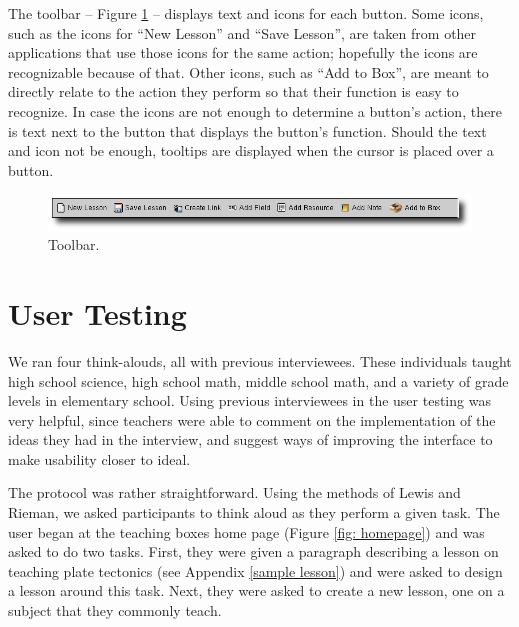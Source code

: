 \documentclass[10pt,letter,titlepage]{article}
\begin{document}
The toolbar -- Figure \ref{fig: toolbar ss} -- displays text and icons for each
button. Some icons, such as the icons for ``New Lesson'' and ``Save Lesson'',
are taken from other applications that use those icons for the same action;
hopefully the icons are recognizable because of that. Other icons, such as ``Add
to Box'', are meant to directly relate to the action they perform so that their
function is easy to recognize. In case the icons are not enough to determine a
button's action, there is text next to the button that displays the button's
function. Should the text and icon not be enough, tooltips are displayed when
the cursor is placed over a button.

\begin{figure}[htb]
	\centering
	\includegraphics[width=0.9\linewidth]{figures/toolbar}
	\caption{Toolbar.}
	\label{fig: toolbar ss}
\end{figure}

\section{User Testing}
We ran four think-alouds, all with previous interviewees.  These individuals
taught high school science, high school math, middle school math, and a variety
of grade levels in elementary school.  Using previous interviewees in the user
testing was very helpful, since teachers were able to comment on the
implementation of the ideas they had in the interview, and suggest ways of
improving the interface to make usability closer to ideal.

The protocol was rather straightforward. Using the methods of Lewis and Rieman,
we asked participants to think aloud as they perform a given task. The user
began at the teaching boxes home page (Figure \ref{fig: homepage}) and was asked
to do two tasks.  First, they were given a paragraph describing a lesson on
teaching plate tectonics (see Appendix \ref{sample lesson}) and were asked to
design a lesson around this task.  Next, they were asked to create a new lesson,
one on a subject that they commonly teach.
\end{document}
